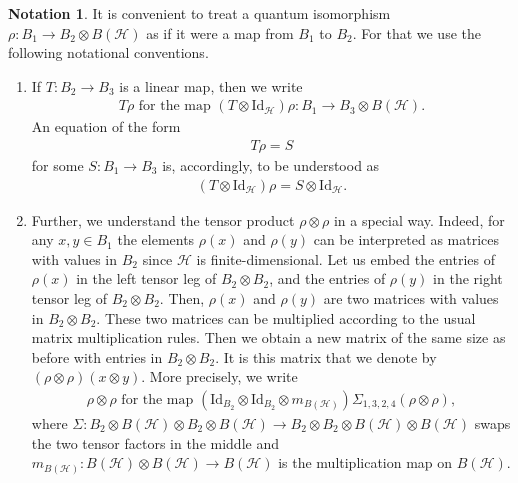 \documentclass{amsart}
\theoremstyle{definition}
\newtheorem{notation}[thm]{Notation}
\theoremstyle{definition}
\begin{document}
\begin{notation}
    \label{pre::notation:quantum_functions}
    It is convenient to treat a quantum isomorphism $\rho: B_1 \to B_2 \otimes B(\mathcal{H})$ as if it were a map from $B_1$ to $B_2$. For that we use the following notational conventions.
    \begin{enumerate}
        \item If $T: B_2 \to B_3$ is a linear map, then we write
        \begin{align*}
            T \rho
            \text{ for the map }
            (T \otimes \mathrm{Id}_{\mathcal{H}}) \rho: B_1 \to B_3 \otimes B(\mathcal{H}).
        \end{align*}
        An equation of the form 
        \begin{align*}
            T \rho = S
        \end{align*}
        for some $S: B_1 \to B_3$ is, accordingly, to be understood as
        \begin{align*}
            (T \otimes \mathrm{Id}_{\mathcal{H}}) \rho = S \otimes \mathrm{Id}_{\mathcal{H}}.
        \end{align*}
        \item Further, we understand the tensor product $\rho \otimes \rho$ in a special way. Indeed, for any $x, y \in B_1$ the elements $\rho(x)$ and $\rho(y)$ can be interpreted as matrices with values in $B_2$ since $\mathcal{H}$ is finite-dimensional. Let us embed the entries of $\rho(x)$ in the left tensor leg of $B_2 \otimes B_2$, and the entries of $\rho(y)$ in the right tensor leg of $B_2 \otimes B_2$. Then, $\rho(x)$ and $\rho(y)$ are two matrices with values in $B_2 \otimes B_2$. These two matrices can be multiplied according to the usual matrix multiplication rules. Then we obtain a new matrix of the same size as before with entries in $B_2 \otimes B_2$. It is this matrix that we denote by $(\rho \otimes \rho)(x \otimes y)$. More precisely, we write
        \begin{align*}
            \rho \otimes \rho 
            \text{ for the map }
            (\mathrm{Id}_{B_2} \otimes \mathrm{Id}_{B_2} \otimes m_{B(\mathcal{H})}) \Sigma_{1, 3, 2, 4} (\rho \otimes \rho),
        \end{align*}
        where $\Sigma: B_2 \otimes B(\mathcal{H}) \otimes B_2 \otimes B(\mathcal{H}) \to B_2 \otimes B_2 \otimes B(\mathcal{H}) \otimes B(\mathcal{H})$ swaps the two tensor factors in the middle and $m_{B(\mathcal{H})}: B(\mathcal{H}) \otimes B(\mathcal{H}) \to B(\mathcal{H})$ is the multiplication map on $B(\mathcal{H})$.

\end{enumerate}
\end{notation}
\end{document}
